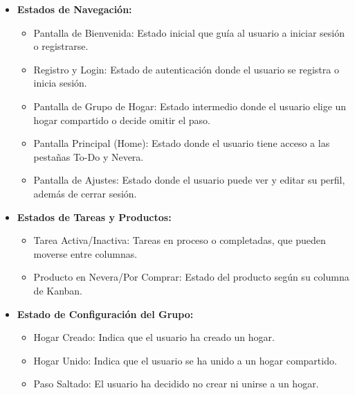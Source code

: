 \documentclass{article}
\begin{document}
\begin{itemize}
\begin{itemize}
        \item \textbf{Estados de Navegación:}
        \begin{itemize}
            \item Pantalla de Bienvenida: Estado inicial que guía al usuario a iniciar sesión o registrarse.
            \item Registro y Login: Estado de autenticación donde el usuario se registra o inicia sesión.
            \item Pantalla de Grupo de Hogar: Estado intermedio donde el usuario elige un hogar compartido o decide omitir el paso.
            \item Pantalla Principal (Home): Estado donde el usuario tiene acceso a las pestañas To-Do y Nevera.
            \item Pantalla de Ajustes: Estado donde el usuario puede ver y editar su perfil, además de cerrar sesión.
        \end{itemize}
        
        \item \textbf{Estados de Tareas y Productos:}
        \begin{itemize}
            \item Tarea Activa/Inactiva: Tareas en proceso o completadas, que pueden moverse entre columnas.
            \item Producto en Nevera/Por Comprar: Estado del producto según su columna de Kanban.
        \end{itemize}
        
        \item \textbf{Estado de Configuración del Grupo:}
        \begin{itemize}
            \item Hogar Creado: Indica que el usuario ha creado un hogar.
            \item Hogar Unido: Indica que el usuario se ha unido a un hogar compartido.
            \item Paso Saltado: El usuario ha decidido no crear ni unirse a un hogar.
        \end{itemize}
    \end{itemize}
\end{itemize}
\end{document}
